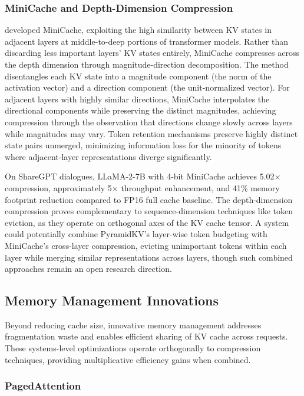 \subsubsection{MiniCache and Depth-Dimension Compression}

\citet{jia2024minicache} developed MiniCache, exploiting the high similarity between KV states in adjacent layers at middle-to-deep portions of transformer models. Rather than discarding less important layers' KV states entirely, MiniCache compresses across the depth dimension through magnitude-direction decomposition. The method disentangles each KV state into a magnitude component (the norm of the activation vector) and a direction component (the unit-normalized vector). For adjacent layers with highly similar directions, MiniCache interpolates the directional components while preserving the distinct magnitudes, achieving compression through the observation that directions change slowly across layers while magnitudes may vary. Token retention mechanisms preserve highly distinct state pairs unmerged, minimizing information loss for the minority of tokens where adjacent-layer representations diverge significantly.

On ShareGPT dialogues, LLaMA-2-7B with 4-bit MiniCache achieves 5.02$\times$ compression, approximately 5$\times$ throughput enhancement, and 41\% memory footprint reduction compared to FP16 full cache baseline. The depth-dimension compression proves complementary to sequence-dimension techniques like token eviction, as they operate on orthogonal axes of the KV cache tensor. A system could potentially combine PyramidKV's layer-wise token budgeting with MiniCache's cross-layer compression, evicting unimportant tokens within each layer while merging similar representations across layers, though such combined approaches remain an open research direction.

\subsection{Memory Management Innovations}

Beyond reducing cache size, innovative memory management addresses fragmentation waste and enables efficient sharing of KV cache across requests. These systems-level optimizations operate orthogonally to compression techniques, providing multiplicative efficiency gains when combined.

\subsubsection{PagedAttention}

